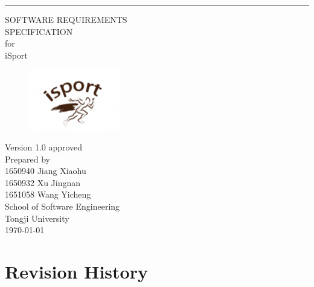 \documentclass[16pt]{scrreprt}
\date{}
\def\myversion{1.0 }
\begin{document}
\begin{flushright}
    \rule{16cm}{5pt}\vskip1cm
    \begin{bfseries}
        \LARGE{SOFTWARE REQUIREMENTS\\ SPECIFICATION}\\
        \vspace{0.8cm}
        for\\
        \vspace{0.8cm}
        iSport\\
        \begin{figure}[H]
		\flushright
  		\includegraphics[width=.2\textwidth]{figures/logo.png}
		\end{figure}
        \vspace{0.8cm}
        \normalsize{Version \myversion approved}\\
        \vspace{1.0cm}
        Prepared by\vspace{0.5cm} \\ 
        \normalsize{1650940 Jiang Xiaohu\\1650932 Xu Jingnan\\1651058 Wang Yicheng}
        \\
        \vspace{1.1cm}
        \normalsize{School of Software Engineering\\ Tongji University}\\
        \vspace{1.0cm}
        \today\\
    \end{bfseries}
\end{flushright}

\tableofcontents


\chapter*{Revision History}
\end{document}
